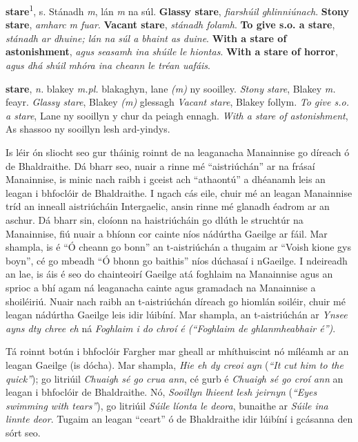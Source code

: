 \textbf{stare}\textsuperscript{1}, s. Stánadh \textit{m}, lán \textit{m} na súl. \textbf{Glassy stare}, \textit{fiarshúil ghlinniúnach}. \textbf{Stony stare}, \textit{amharc m fuar}. \textbf{Vacant stare}, \textit{stánadh folamh}. \textbf{To give s.o. a stare}, \textit{stánadh ar dhuine; lán na súl a bhaint as duine}. \textbf{With a stare of astonishment}, \textit{agus seasamh ina shúile le hiontas}. \textbf{With a stare of horror}, \textit{agus dhá shúil mhóra ina cheann le tréan uafáis}.

\vspace{0.8ex}

\textbf{stare}, \textit{n.} blakey \textit{m.pl.} blakaghyn, lane \textit{(m)} ny sooilley. \textit{Stony stare}, Blakey \textit{m.} feayr. \textit{Glassy stare}, Blakey \textit{(m)} glessagh \textit{Vacant stare}, Blakey follym. \textit{To give s.o. a stare}, Lane ny sooillyn y chur da peiagh ennagh. \textit{With a stare of astonishment}, As shassoo ny sooillyn lesh ard-yindys.

\vspace{1.4ex}

Is léir ón sliocht seo gur tháinig roinnt de na leaganacha
Manainnise go díreach ó de Bhaldraithe.
Dá bharr seo, nuair a rinne mé ``aistriúchán'' ar na
frásaí Manainnise, is minic nach raibh i gceist ach ``athaontú''
a dhéanamh leis an leagan i bhfoclóir de Bhaldraithe.  I ngach cás eile,
chuir mé an leagan Manainnise tríd an inneall aistriúcháin Intergaelic,
ansin rinne mé glanadh éadrom ar an aschur.
Dá bharr sin, cloíonn na haistriúcháin go dlúth le struchtúr na Manainnise,
fiú nuair a bhíonn cor cainte níos nádúrtha Gaeilge ar fáil.
Mar shampla, is é ``Ó cheann go bonn'' an t-aistriúchán a thugaim ar 
``Voish kione gys boyn'', cé go mbeadh ``Ó bhonn go baithis'' níos
dúchasaí i nGaeilge. I ndeireadh an lae, is áis é seo do
chainteoirí Gaeilge atá foghlaim na Manainnise agus an sprioc a bhí 
agam ná leaganacha cainte agus gramadach na Manainnise a shoiléiriú.
Nuair nach raibh an t-aistriúchán díreach go hiomlán soiléir, 
chuir mé leagan nádúrtha Gaeilge leis idir lúibíní. Mar shampla,
an t-aistriúchán ar \textit{Ynsee ayns dty chree eh} ná
\textit{Foghlaim i do chroí é (``Foghlaim de ghlanmheabhair é'')}.

Tá roinnt botún i bhfoclóir Fargher mar gheall ar mhíthuiscint nó míléamh 
ar an leagan Gaeilge (is dócha). Mar shampla, 
\textit{Hie eh dy creoi ayn} (\textit{``It cut him to the quick''});
go litriúil \textit{Chuaigh sé go crua ann}, cé gurb é 
\textit{Chuaigh sé go croí ann} an leagan i bhfoclóir de Bhaldraithe.
Nó, \textit{Sooillyn lhieent lesh jeirnyn} (\textit{``Eyes swimming with tears''}), go litriúil \textit{Súile líonta le deora}, bunaithe ar
\textit{Súile ina linnte deor}. Tugaim an leagan ``ceart'' ó de Bhaldraithe
idir lúibíní i gcásanna den sórt seo.

